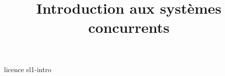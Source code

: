 \documentclass [xcolor=table] {beamer}
\title {Introduction aux systèmes concurrents}
\begin{document}
 {licence}
 {sl1-intro}
\end{document}
